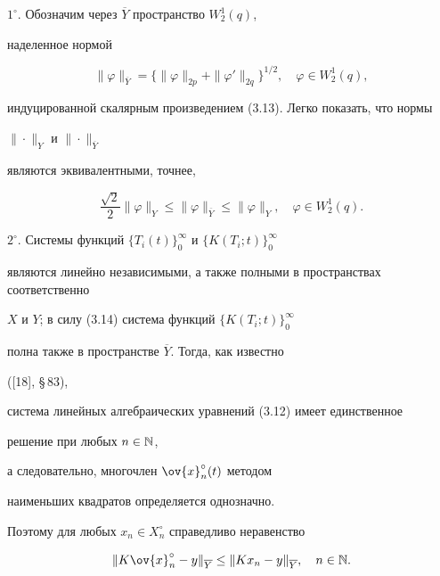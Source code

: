 $1^\circ $. Обозначим через $\overline{Y}$ пространство $W_2^1(q)$,


наделенное нормой


$$


\|\varphi\|_{\overline Y}=\{


\|\varphi\|_{2p} +\|\varphi'\|_{2q}


\}^{1/2},\quad \varphi\in W_2^1(q),


$$


индуцированной скалярным произведением (3.13). Легко показать, что нормы


$\|\cdot\|_Y$ и $\|\cdot\|_{\overline Y}$


являются эквивалентными, точнее,


\begin{equation}


\frac{\sqrt{2}}{2}\|\varphi\|_Y \leq


\|\varphi\|_{\overline Y}\leq


\|\varphi\|_Y ,\quad \varphi\in W_2^1(q).


\end{equation}





$2^\circ$. Системы функций $\{ T_i(t)\}_0^\infty$ и $\{ K(T_i;t)\}_0^\infty$


являются линейно независимыми, а также полными в пространствах соответственно


$X$ и $Y$; в силу (3.14) система функций $\{ K(T_i;t)\}_0^\infty$


полна также в пространстве $\overline{Y}$. Тогда, как известно


([18], \S\,83),


система линейных алгебраических уравнений (3.12) имеет единственное


решение при любых $n\in \Bbb N$, 


а следовательно, многочлен $\ov{x}_n^\circ (t)$ методом


наименьших квадратов определяется однозначно.


Поэтому для любых $x_n\in X_n^\circ $ справедливо неравенство


\begin{equation}


\|K\ov{x}_n^\circ -y\|_{\overline Y}\leq


\|Kx_n-y\|_{\overline Y},\quad n\in \Bbb N.


\end{equation}





